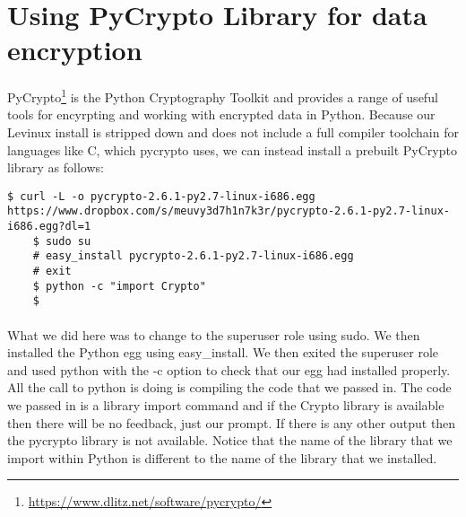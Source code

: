 \documentclass[12pt, a4paper, twoside]{book}
\begin{document}
\section{Using PyCrypto Library for data encryption}
\label{pycrypto}
\paragraph{} PyCrypto\footnote{\url{https://www.dlitz.net/software/pycrypto/}} is the Python Cryptography Toolkit and provides a range of useful tools for encyrpting and working with encrypted data in Python. Because our Levinux install is stripped down and does not include a full compiler toolchain for languages like C, which pycrypto uses, we can instead install a prebuilt PyCrypto library as follows:

\begin{lstlisting}[style=DOS]
    $ curl -L -o pycrypto-2.6.1-py2.7-linux-i686.egg https://www.dropbox.com/s/meuvy3d7h1n7k3r/pycrypto-2.6.1-py2.7-linux-i686.egg?dl=1
    $ sudo su
    # easy_install pycrypto-2.6.1-py2.7-linux-i686.egg
    # exit
    $ python -c "import Crypto"
    $
\end{lstlisting}

\paragraph{} What we did here was to change to the superuser role using sudo. We then installed the Python egg using easy\_install. We then exited the superuser role and used python with the -c option to check that our egg had installed properly. All the call to python is doing is compiling the code that we passed in. The code we passed in is a library import command and if the Crypto library is available then there will be no feedback, just our prompt. If there is any other output then the pycrypto library is not available. Notice that the name of the library that we import within Python is different to the name of the library that we installed.
\end{document}
